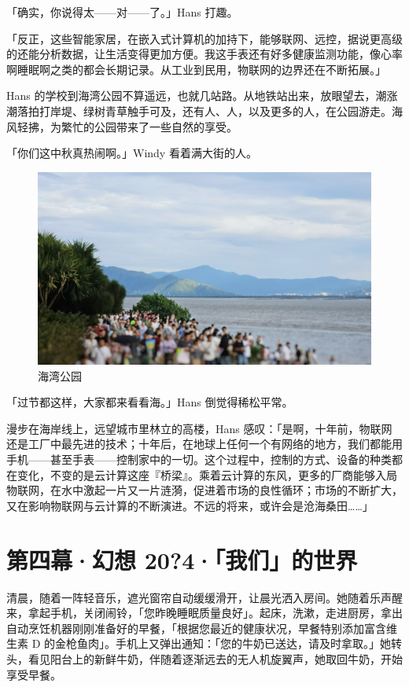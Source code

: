 「确实，你说得太——对——了。」Hans 打趣。

「反正，这些智能家居，在嵌入式计算机的加持下，能够联网、远控，据说更高级的还能分析数据，让生活变得更加方便。我这手表还有好多健康监测功能，像心率啊睡眠啊之类的都会长期记录。从工业到民用，物联网的边界还在不断拓展。」

Hans 的学校到海湾公园不算遥远，也就几站路。从地铁站出来，放眼望去，潮涨潮落拍打岸堤、绿树青草触手可及，还有人、人，以及更多的人，在公园游走。海风轻拂，为繁忙的公园带来了一些自然的享受。

「你们这中秋真热闹啊。」Windy 看着满大街的人。

\begin{figure}[htb!]
  \centering
  \includegraphics[width=.7\textwidth]{assets/surpass/The_seaside_park.jpg}
  \caption{海湾公园}
  \label{fig:The_seaside_park}
\end{figure}

「过节都这样，大家都来看看海。」Hans 倒觉得稀松平常。

漫步在海岸线上，远望城市里林立的高楼，Hans 感叹：「是啊，十年前，物联网还是工厂中最先进的技术；十年后，在地球上任何一个有网络的地方，我们都能用手机——甚至手表——控制家中的一切。这个过程中，控制的方式、设备的种类都在变化，不变的是云计算这座『桥梁』。乘着云计算的东风，更多的厂商能够入局物联网，在水中激起一片又一片涟漪，促进着市场的良性循环；市场的不断扩大，又在影响物联网与云计算的不断演进。不远的将来，或许会是沧海桑田……」

\section{第四幕·幻想 20?4·「我们」的世界}

清晨，随着一阵轻音乐，遮光窗帘自动缓缓滑开，让晨光洒入房间。她随着乐声醒来，拿起手机，关闭闹铃，「您昨晚睡眠质量良好」。起床，洗漱，走进厨房，拿出自动烹饪机器刚刚准备好的早餐，「根据您最近的健康状况，早餐特别添加富含维生素 D 的金枪鱼肉」。手机上又弹出通知：「您的牛奶已送达，请及时拿取。」她转头，看见阳台上的新鲜牛奶，伴随着逐渐远去的无人机旋翼声，她取回牛奶，开始享受早餐。

